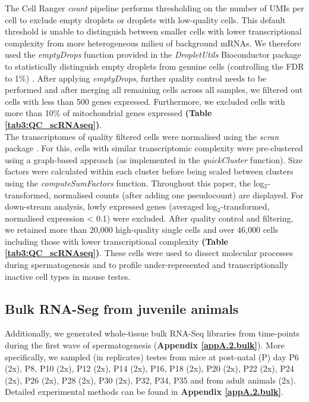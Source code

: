 The Cell Ranger \emph{count} pipeline performs thresholding on the number of UMIs per cell to exclude empty droplets or droplets with low-quality cells. This default threshold is unable to distinguish between smaller cells with lower transcriptional complexity from more heterogeneous milieu of background mRNAs. We therefore used the \emph{emptyDrops} function provided in the \emph{DropletUtils} Bioconductor package to statistically distinguish empty droplets from genuine cells (controlling the FDR to 1\%) \citep{Lun2018}. After applying \emph{emptyDrops}, further quality control needs to be performed and after merging all remaining cells across all samples, we filtered out cells with less than 500 genes expressed. Furthermore, we excluded cells with more than 10\% of mitochondrial genes expressed \textbf{(Table \ref{tab3:QC_scRNAseq})}.\\
 
The transcriptomes of quality filtered cells were normalised using the \emph{scran} package \citep{Lun2016pooling}. For this, cells with similar transcriptomic complexity were pre-clustered using a graph-based approach (as implemented in the \emph{quickCluster} function). Size factors were
calculated within each cluster before being scaled between clusters using the \emph{computeSumFactors} function. Throughout this paper, the log$_2$-transformed, normalised counts (after adding one pseudocount) are displayed. For down-stream analysis, lowly expressed genes (averaged log$_2$-transformed, normalised expression < 0.1) were excluded. After quality control and filtering, we retained more than 20,000 high-quality single cells and over 46,000 cells including those with lower transcriptional complexity \textbf{(Table \ref{tab3:QC_scRNAseq})}. These cells were used to dissect molecular processes during spermatogenesis and to profile under-represented and transcriptionally inactive cell types in mouse testes. 

\subsection{Bulk RNA-Seg from juvenile animals}

Additionally, we generated whole-tissue bulk RNA-Seq libraries from time-points during the first wave of spermatogenesis (\textbf{Appendix \ref{appA.2.bulk}}). More specifically, we sampled (in replicates) testes from mice at post-natal (P) day P6 (2x), P8, P10 (2x), P12 (2x), P14 (2x), P16, P18 (2x), P20 (2x), P22 (2x), P24 (2x), P26 (2x), P28 (2x), P30 (2x), P32, P34, P35 and from adult animals (2x). Detailed experimental methods can be found in \textbf{Appendix \ref{appA.2.bulk}}. 
\\

